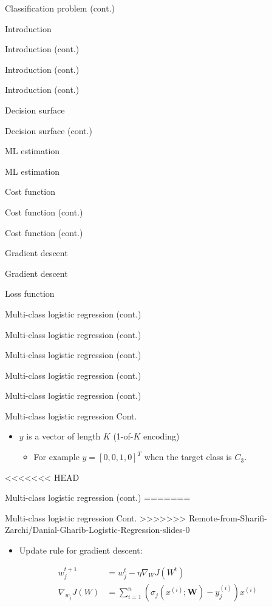 \documentclass[serif, aspectratio=169]{beamer}
\begin{document}
\begin{frame}{Classification problem (cont.)}
\begin{itemize}
\begin{frame}{Introduction}
\begin{itemize}
\begin{frame}{Introduction (cont.)}
\begin{frame}{Introduction (cont.)}
\begin{frame}{Introduction (cont.)}
\begin{frame}{Decision surface}
\begin{itemize}
\begin{frame}{Decision surface (cont.)}
\begin{frame}{ML estimation}
\begin{frame}{ML estimation}
\begin{itemize}
\begin{frame}{Cost function}
\begin{frame}{Cost function (cont.)}
\begin{itemize}
\begin{itemize}
\begin{frame}{Cost function (cont.)}
\begin{frame}{Gradient descent}
\begin{frame}{Gradient descent}
\begin{frame}{Loss function}
\begin{frame}{Multi-class logistic regression (cont.)}
\begin{frame}{Multi-class logistic regression (cont.)}
\begin{frame}{Multi-class logistic regression (cont.)}
\begin{frame}{Multi-class logistic regression (cont.)}
\begin{frame}{Multi-class logistic regression (cont.)}
\begin{frame}{Multi-class logistic regression Cont.}
\begin{itemize}
        \item $y$ is a vector of length $K$ (1-of-$K$ encoding)
            \begin{itemize}
                \item For example $y=[0,0,1,0]^T$ when the target class is $C_3$.
            \end{itemize}
    \end{itemize}
\end{frame}
<<<<<<< HEAD
\begin{frame}{Multi-class logistic regression (cont.)}
=======
\begin{frame}{Multi-class logistic regression Cont.}
>>>>>>> Remote-from-Sharifi-Zarchi/Danial-Gharib-Logistic-Regression-slides-0
    \begin{itemize}
        \item Update rule for gradient descent:
        
    \end{itemize}
    \begin{align*}
            w_j^{t+1} &= w_j^t - \eta \nabla _W J(W^t) \\
            \nabla _{w_{j}} J(W) &= \sum_{i=1}^{n} (\sigma _j(x^{(i)}; \mathbf{W}) - y_j^{(i)})x^{(i)}
        \end{align*}
        

\end{frame}
\end{frame}
\end{frame}
\end{frame}
\end{frame}
\end{frame}
\end{frame}
\end{frame}
\end{frame}
\end{frame}
\end{frame}
\end{itemize}
\end{itemize}
\end{frame}
\end{frame}
\end{itemize}
\end{frame}
\end{frame}
\end{frame}
\end{itemize}
\end{frame}
\end{frame}
\end{frame}
\end{frame}
\end{itemize}
\end{frame}
\end{itemize}
\end{frame}
\end{document}
